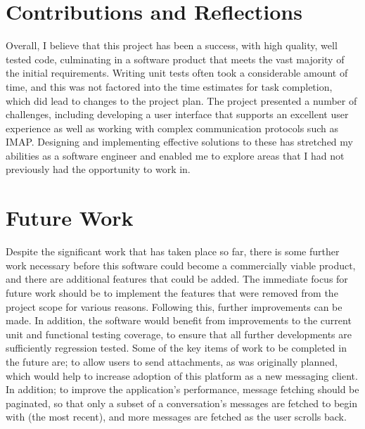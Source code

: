 \section{Contributions and Reflections}


Overall, I believe that this project has been a success, with high quality, well tested code, culminating in a software product that meets the vast majority of the initial requirements. Writing unit tests often took a considerable amount of time, and this was not factored into the time estimates for task completion, which did lead to changes to the project plan. The project presented a number of challenges, including developing a user interface that supports an excellent user experience as well as working with complex communication protocols such as IMAP. Designing and implementing effective solutions to these has stretched my abilities as a software engineer and enabled me to explore areas that I had not previously had the opportunity to work in.

\section{Future Work}
Despite the significant work that has taken place so far, there is some further work necessary before this software could become a commercially viable product, and there are additional features that could be added. The immediate focus for future work should be to implement the features that were removed from the project scope for various reasons. Following this, further improvements can be made. In addition, the software would benefit from improvements to the current unit and functional testing coverage, to ensure that all further developments are sufficiently regression tested. Some of the key items of work to be completed in the future are; to allow users to send attachments, as was originally planned, which would help to increase adoption of this platform as a new messaging client. In addition; to improve the application's performance, message fetching should be paginated, so that only a subset of a conversation's messages are fetched to begin with (the most recent), and more messages are fetched as the user scrolls back.
